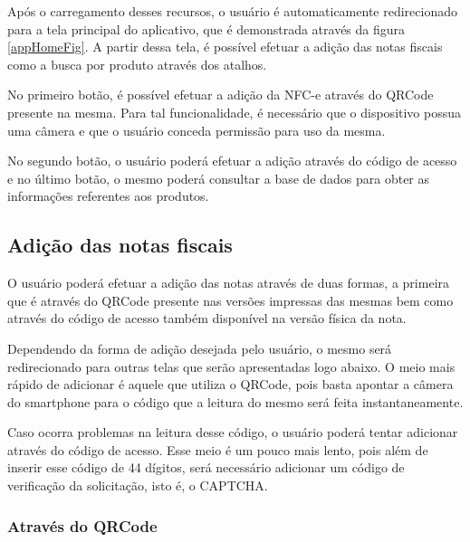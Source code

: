 \newpage
Após o carregamento desses recursos, o usuário é automaticamente redirecionado para a tela principal do aplicativo, que é demonstrada através da figura \ref{appHomeFig}. A partir dessa tela, é possível efetuar a adição das notas fiscais como a busca por produto através dos atalhos.

No primeiro botão, é possível efetuar a adição da NFC-e através do QRCode presente na mesma. Para tal funcionalidade, é necessário que o dispositivo possua uma câmera e que o usuário conceda permissão para uso da mesma.

No segundo botão, o usuário poderá efetuar a adição através do código de acesso e no último botão, o mesmo poderá consultar a base de dados para obter as informações referentes aos produtos.

\subsection{Adição das notas fiscais}

O usuário poderá efetuar a adição das notas através de duas formas, a primeira que é através do QRCode presente nas versões impressas das mesmas bem como através do código de acesso também disponível na versão física da nota.

Dependendo da forma de adição desejada pelo usuário, o mesmo será redirecionado para outras telas que serão apresentadas logo abaixo. O meio mais rápido de adicionar é aquele que utiliza o QRCode, pois basta apontar a câmera do smartphone para o código que a leitura do mesmo será feita instantaneamente.

Caso ocorra problemas na leitura desse código, o usuário poderá tentar adicionar através do código de acesso. Esse meio é um pouco mais lento, pois além de inserir esse código de 44 dígitos, será necessário adicionar um código de verificação da solicitação, isto é, o CAPTCHA.

\subsubsection{Através do QRCode}

